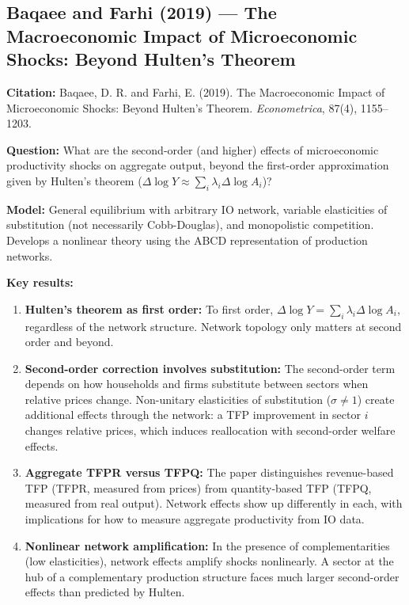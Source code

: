 \documentclass[12pt]{article}
\begin{document}
\subsection{Baqaee and Farhi (2019) --- The Macroeconomic Impact of Microeconomic Shocks: Beyond Hulten's Theorem}

\textbf{Citation:} Baqaee, D. R. and Farhi, E. (2019). The Macroeconomic Impact of Microeconomic Shocks: Beyond Hulten's Theorem. \textit{Econometrica}, 87(4), 1155--1203.

\textbf{Question:} What are the second-order (and higher) effects of microeconomic productivity shocks on aggregate output, beyond the first-order approximation given by Hulten's theorem ($\Delta \log Y \approx \sum_i \lambda_i \Delta \log A_i$)?

\textbf{Model:} General equilibrium with arbitrary IO network, variable elasticities of substitution (not necessarily Cobb-Douglas), and monopolistic competition. Develops a nonlinear theory using the ABCD representation of production networks.

\textbf{Key results:}
\begin{enumerate}
    \item \textbf{Hulten's theorem as first order:} To first order, $\Delta \log Y = \sum_i \lambda_i \Delta \log A_i$, regardless of the network structure. Network topology only matters at second order and beyond.
    \item \textbf{Second-order correction involves substitution:} The second-order term depends on how households and firms substitute between sectors when relative prices change. Non-unitary elasticities of substitution ($\sigma \neq 1$) create additional effects through the network: a TFP improvement in sector $i$ changes relative prices, which induces reallocation with second-order welfare effects.
    \item \textbf{Aggregate TFPR versus TFPQ:} The paper distinguishes revenue-based TFP (TFPR, measured from prices) from quantity-based TFP (TFPQ, measured from real output). Network effects show up differently in each, with implications for how to measure aggregate productivity from IO data.
    \item \textbf{Nonlinear network amplification:} In the presence of complementarities (low elasticities), network effects amplify shocks nonlinearly. A sector at the hub of a complementary production structure faces much larger second-order effects than predicted by Hulten.
\end{enumerate}
\end{document}
